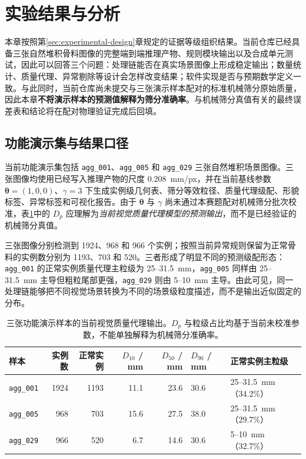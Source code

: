 \section{实验结果与分析}
\label{sec:results}

本章按照第\ref{sec:experimental-design}章规定的证据等级组织结果。当前仓库已经具备三张自然堆积骨料图像的完整端到端推理产物、规则模块输出以及合成单元测试，因此可以回答三个问题：处理链能否在真实场景图像上形成稳定输出；数量统计、质量代理、异常剔除等设计会怎样改变结果；软件实现是否与预期数学定义一致。与此同时，当前仓库尚未提交与三张演示样本配对的标准机械筛分原始质量，因此本章\textbf{不将演示样本的预测值解释为筛分准确率}。与机械筛分真值有关的最终误差表和结论将在配对物理验证完成后回填。

\subsection{功能演示集与结果口径}
\label{sec:demo-results-scope}

当前功能演示集包括 \texttt{agg\_001}、\texttt{agg\_005} 和 \texttt{agg\_029} 三张自然堆积场景图像。三张图像均使用已经写入推理产物的尺度 $0.208$~mm/px，并在当前基线参数 $\boldsymbol{\theta}=(1,0,0)$、$\gamma=3$ 下生成实例级几何表、筛分等效粒径、质量代理级配、形貌标签、异常标签和可视化报告。由于 $\boldsymbol{\theta}$ 与 $\gamma$ 尚未通过本赛题配对机械筛分批次校准，表\ref{tab:demo-main-results}中的 $D_p$ 应理解为\emph{当前视觉质量代理模型的预测输出}，而不是已经验证的机械筛分真值。

三张图像分别检测到 1924、968 和 966 个实例；按照当前异常规则保留为正常骨料的实例数分别为 1193、703 和 520。三者形成了明显不同的预测级配形态：\texttt{agg\_001} 的正常实例质量代理主粒级为 25--31.5~mm，\texttt{agg\_005} 同样由 25--31.5~mm 主导但粗粒尾部更强，\texttt{agg\_029} 则由 5--10~mm 主导。由此可见，同一处理链能够把不同视觉场景转换为不同的场景级粒度描述，而不是输出近似固定的分布。

\begin{table}[htbp]
\centering
\caption{三张功能演示样本的当前视觉质量代理输出。$D_p$ 与粒级占比均基于当前未校准参数，不能单独解释为机械筛分准确率。}
\label{tab:demo-main-results}
\small
\renewcommand{\arraystretch}{1.15}
\begin{tabular}{lrrrrll}
\toprule
样本 & 实例数 & 正常实例 & $D_{10}$ / mm & $D_{50}$ / mm & $D_{90}$ / mm & 正常实例主粒级 \\
\midrule
\texttt{agg\_001} & 1924 & 1193 & 11.1 & 23.6 & 30.6 & 25--31.5~mm（34.2\%） \\
\texttt{agg\_005} & 968  & 703  & 15.6 & 27.5 & 38.0 & 25--31.5~mm（29.7\%） \\
\texttt{agg\_029} & 966  & 520  & 6.7  & 14.6 & 30.6 & 5--10~mm（32.7\%） \\
\bottomrule
\end{tabular}
\end{table}

